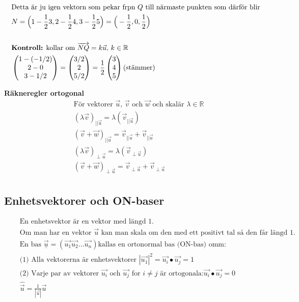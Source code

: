 \begin{align*}
  &\quad  \text{Detta är ju igen vektorn som pekar frpn $Q$ till närmaste punkten som därför blir} \\
  &\quad  N = \Big( 1-\frac{1}{2}3, 2-\frac{1}{2}4, 3-\frac{1}{2}5 \Big)
  = \Big( -\frac{1}{2},0,\frac{1}{2} \Big) \\
  &\quad  \\
  &\quad  \text{\textbf{Kontroll:} kollar om } \overrightarrow{NQ} = k\vec{u}, \, k\in\mathbb{R} \\
  &\quad  \begin{pmatrix} 1-(-1/2) \\ 2-0 \\ 3-1/2 \end{pmatrix} =
  \begin{pmatrix} 3/2 \\ 2 \\ 5/2 \end{pmatrix} =
  \frac{1}{2}\begin{pmatrix} 3 \\ 4 \\ 5 \end{pmatrix} \text{(stämmer)} \\
\end{align*}


\textbf{Räkneregler ortogonal}
\begin{align*} 
  &\quad  \text{För vektorer $\vec{u}$, $\vec{v}$ och $\vec{w}$ och skalär $\lambda\in\mathbb{R}$} \\
  &\quad  {(\lambda\vec{v})}_{||\vec{u}}=\lambda(\vec{v}_{||\vec{u}}) \\
  &\quad  {(\vec{v}+\vec{w})}_{||\vec{u}} = \vec{v}_{||\vec{u}} + \vec{v}_{||\vec{u}} \\
  &\quad  {(\lambda\vec{v})}_{\perp{\vec{u}}} = \lambda(\vec{v}_{\perp\vec{u}}) \\
  &\quad  {(\vec{v}+\vec{w})}_{\perp{\vec{u}}} = \vec{v}_{\perp{\vec{u}}} + \vec{v}_{\perp{\vec{u}}} \\
\end{align*}


\subsection{Enhetsvektorer och ON-baser}
\begin{align*} 
  &\quad  \text{En enhetsvektor är en vektor med längd 1.} \\
  &\quad  \text{Om man har en vektor $\vec{u}$ kan man skala om
    den med ett positivt tal så den får längd 1.} \\
  &\quad  \text{En bas } \underline{\vec{u}} = (\vec{u_1} \vec{u_2} \ldots \vec{u_n})
  \text{kallas en ortonormal bas (ON-bas) omm:} \\
  &\quad  \text{(1)  Alla vektorerna är enhetsvektorer }
  |\vec{u_1}|^2 = \vec{u_i}\bullet\vec{u_j} = 1 \\
  &\quad  \text{(2)  Varje par av vektorer $\vec{u_i}$ och $\vec{u_j}$ for $i\neq{j}$ är ortogonala:}
  \vec{u_i}\bullet\vec{u_j}=0 \\
  &\quad  \hat{\vec{u}} = \frac{1}{|\vec{u}|}\vec{u} \\
\end{align*}


